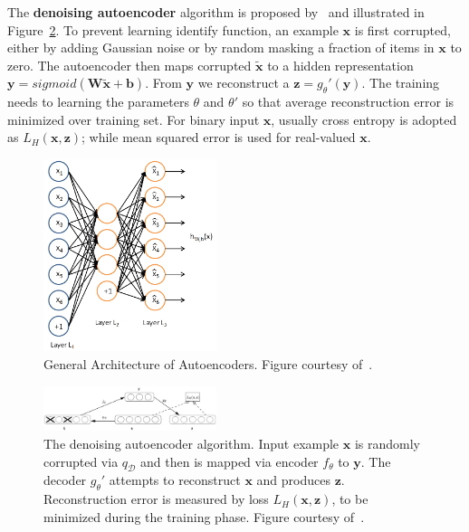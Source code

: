 The \textbf{denoising autoencoder} algorithm is proposed by~\cite{DenoiseAE} and illustrated in
Figure~\ref{Fig:dAEAlgorithm}.
To prevent learning identify function, an example $\mathbf{x}$ is first corrupted, either by
adding Gaussian noise or by random masking a fraction of items in $\mathbf{x}$ to zero.
The autoencoder then maps corrupted $\mathbf{\tilde{x}}$ to a hidden representation $\mathbf{y} = sigmoid(\mathbf{W}\tilde{\mathbf{x}} + \mathbf{b})$.
From $\mathbf{y}$ we reconstruct a $\mathbf{z}=g_\theta'(\mathbf{y})$.
The training needs to learning the parameters $\theta$ and $\theta'$ so that average reconstruction error is minimized over training set.
For binary input $\mathbf{x}$, usually cross entropy is adopted as $L_H(\mathbf{x}, \mathbf{z})$;
while mean squared error is used for real-valued $\mathbf{x}$.

\begin{figure}[h]
    \centering
    \includegraphics[width=0.45\textwidth]{figures/autoencoder.png}
    \caption{General Architecture of Autoencoders.
        Figure courtesy of~\cite{UFLDLAutoencoder}.}
    \label{Fig:AEArchitecture}
\end{figure}

\begin{figure}[h]
    \centering
    \includegraphics[width=0.45\textwidth]{figures/denoiseautoencoder.png}
        \caption{The denoising autoencoder algorithm.
        Input example $\mathbf{x}$ is randomly corrupted via $q_\mathcal{D}$ and then
        is mapped via encoder $f_\theta$ to $\mathbf{y}$.
        The decoder $g_\theta'$ attempts to reconstruct $\mathbf{x}$ and produces $\mathbf{z}$.
        Reconstruction error is measured by loss $L_H(\mathbf{x}, \mathbf{z})$, to be minimized
        during the training phase.
        Figure courtesy of~\cite{DenoiseAE}.}
    \label{Fig:dAEAlgorithm}
\end{figure}

